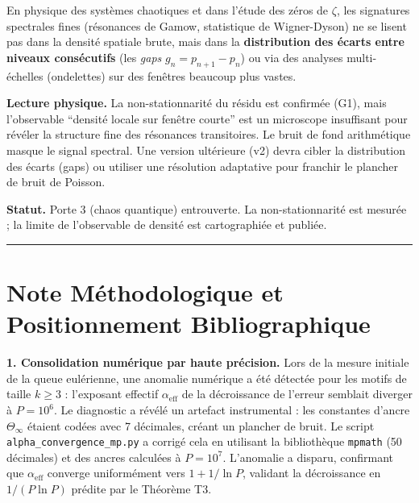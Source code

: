 \documentclass[11pt,a4paper]{article}
\begin{document}
En physique des systèmes chaotiques et dans l'étude des zéros de $\zeta$, les signatures spectrales fines (résonances de Gamow, statistique de Wigner-Dyson) ne se lisent pas dans la densité spatiale brute, mais dans la \textbf{distribution des écarts entre niveaux consécutifs} (les \textit{gaps} $g_n = p_{n+1} - p_n$) ou via des analyses multi-échelles (ondelettes) sur des fenêtres beaucoup plus vastes.

\textbf{Lecture physique.} La non-stationnarité du résidu est confirmée (G1), mais l'observable ``densité locale sur fenêtre courte'' est un microscope insuffisant pour révéler la structure fine des résonances transitoires. Le bruit de fond arithmétique masque le signal spectral. Une version ultérieure (v2) devra cibler la distribution des écarts (gaps) ou utiliser une résolution adaptative pour franchir le plancher de bruit de Poisson.

\textbf{Statut.} Porte 3 (chaos quantique) entrouverte. La non-stationnarité est mesurée ; la limite de l'observable de densité est cartographiée et publiée.

\vspace{1cm}
\hrule
\vspace{1cm}

\section*{Note Méthodologique et Positionnement Bibliographique}

\textbf{1. Consolidation numérique par haute précision.}  
Lors de la mesure initiale de la queue eulérienne, une anomalie numérique a été détectée pour les motifs de taille $k \ge 3$ : l'exposant effectif $\alpha_{\text{eff}}$ de la décroissance de l'erreur semblait diverger à $P = 10^6$. Le diagnostic a révélé un artefact instrumental : les constantes d'ancre $\Theta_\infty$ étaient codées avec 7 décimales, créant un plancher de bruit. Le script \texttt{alpha\_convergence\_mp.py} a corrigé cela en utilisant la bibliothèque \texttt{mpmath} (50 décimales) et des ancres calculées à $P = 10^7$. L'anomalie a disparu, confirmant que $\alpha_{\text{eff}}$ converge uniformément vers $1 + 1/\ln P$, validant la décroissance en $1/(P \ln P)$ prédite par le Théorème T3.
\end{document}
